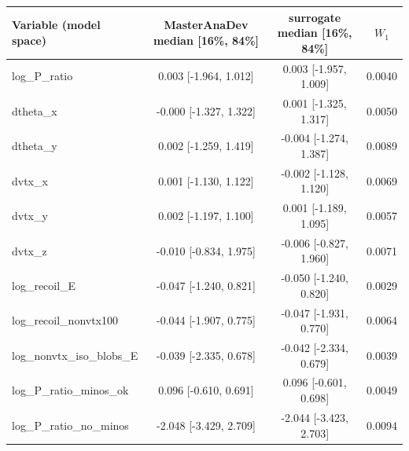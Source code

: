 \begin{tabular}{lccc}
\toprule
Variable (model space) & MasterAnaDev median [16\%, 84\%] & surrogate median [16\%, 84\%] & $W_1$ \\
\midrule
log\_P\_ratio & 0.003 [-1.964, 1.012] & 0.003 [-1.957, 1.009] & 0.0040 \\
dtheta\_x & -0.000 [-1.327, 1.322] & 0.001 [-1.325, 1.317] & 0.0050 \\
dtheta\_y & 0.002 [-1.259, 1.419] & -0.004 [-1.274, 1.387] & 0.0089 \\
dvtx\_x & 0.001 [-1.130, 1.122] & -0.002 [-1.128, 1.120] & 0.0069 \\
dvtx\_y & 0.002 [-1.197, 1.100] & 0.001 [-1.189, 1.095] & 0.0057 \\
dvtx\_z & -0.010 [-0.834, 1.975] & -0.006 [-0.827, 1.960] & 0.0071 \\
log\_recoil\_E & -0.047 [-1.240, 0.821] & -0.050 [-1.240, 0.820] & 0.0029 \\
log\_recoil\_nonvtx100 & -0.044 [-1.907, 0.775] & -0.047 [-1.931, 0.770] & 0.0064 \\
log\_nonvtx\_iso\_blobs\_E & -0.039 [-2.335, 0.678] & -0.042 [-2.334, 0.679] & 0.0039 \\
log\_P\_ratio\_minos\_ok & 0.096 [-0.610, 0.691] & 0.096 [-0.601, 0.698] & 0.0049 \\
log\_P\_ratio\_no\_minos & -2.048 [-3.429, 2.709] & -2.044 [-3.423, 2.703] & 0.0094 \\
\bottomrule
\end{tabular}
